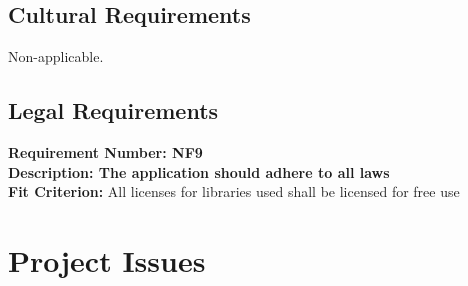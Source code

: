 \documentclass[12pt,fleqn]{article}
\begin{document}
\subsection {Cultural Requirements}
Non-applicable.
\subsection {Legal Requirements}
\begin{tcolorbox}
\textbf{Requirement Number: NF9} \\
\textbf{Description: The application should adhere to all laws}  \\
{\color{red} \textbf{Fit Criterion:} All licenses for libraries used shall be licensed for free use}
\end{tcolorbox}
\pagebreak


\section {Project Issues}
\end{document}
